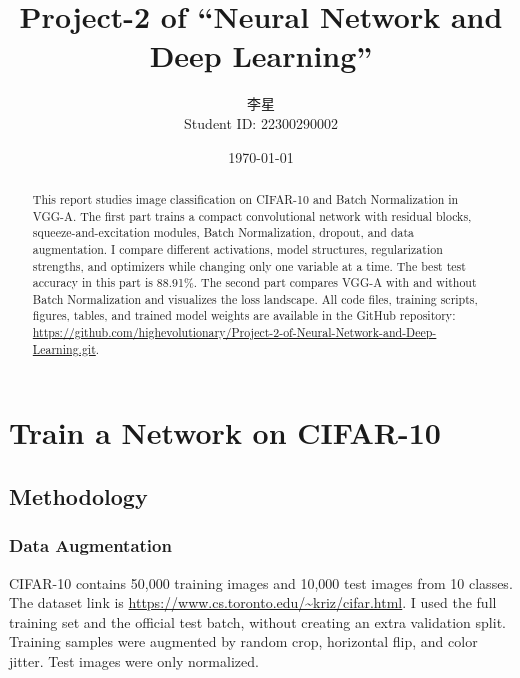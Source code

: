 \documentclass[11pt,a4paper]{article}
\title{Project-2 of ``Neural Network and Deep Learning''}
\author{李星 \\ Student ID: 22300290002}
\date{\today}
\newcommand{\githuburl}{\url{https://github.com/highevolutionary/Project-2-of-Neural-Network-and-Deep-Learning.git}}
\newcommand{\dataseturl}{\url{https://www.cs.toronto.edu/~kriz/cifar.html}}
\begin{document}
\maketitle

\begin{abstract}
This report studies image classification on CIFAR-10 and Batch Normalization in
VGG-A. The first part trains a compact convolutional network with residual
blocks, squeeze-and-excitation modules, Batch Normalization, dropout, and data
augmentation. I compare different activations, model structures, regularization
strengths, and optimizers while changing only one variable at a time. The best
test accuracy in this part is 88.91\%. The second part compares VGG-A with and
without Batch Normalization and visualizes the loss landscape. All code files,
training scripts, figures, tables, and trained model weights are available in
the GitHub repository: \githuburl.
\end{abstract}

\section{Train a Network on CIFAR-10}

\subsection{Methodology}

\subsubsection{Data Augmentation}

CIFAR-10 contains 50,000 training images and 10,000 test images from 10 classes.
The dataset link is \dataseturl. I used the full training set and the official
test batch, without creating an extra validation split. Training samples were
augmented by random crop, horizontal flip, and color jitter. Test images were
only normalized.
\end{document}
